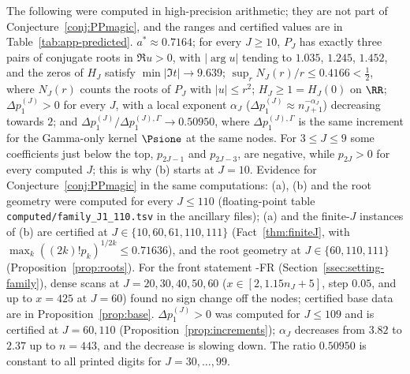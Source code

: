 \begin{observation}\label{obs:predicted}
The following were computed in high-precision arithmetic; they are not part of Conjecture~\ref{conj:PPmagic}, and the ranges
and certified values are in Table~\ref{tab:app-predicted}.
$a^*\approx0.7164$; for every $J\ge10$, $P_J$ has exactly three pairs of conjugate roots in $\Re u>0$, with $\lvert\arg u\rvert$
tending to $1.035$, $1.245$, $1.452$, and the zeros of $H_J$ satisfy $\min|\Im t|\to9.639$; $\sup_rN_J(r)/r\le0.4166<\frac12$,
where $N_J(r)$ counts the roots of $P_J$ with $|u|\le r^2$; $H_J\ge1=H_J(0)$ on $\RR$; $\Delta p_1^{(J)}>0$ for every $J$,
with a local exponent $\alpha_J$ ($\Delta p_1^{(J)}\approx n_{J+1}^{-\alpha_J}$) decreasing towards $2$; and
$\Delta p_1^{(J)}/\Delta p_1^{(J),\Gamma}\to0.50950$, where $\Delta p_1^{(J),\Gamma}$ is the same increment for the
Gamma-only kernel $\Psione$ at the same nodes. For $3\le J\le9$ some coefficients just below the top, $p_{2J-1}$ and
$p_{2J-3}$, are negative, while $p_{2J}>0$ for every computed $J$; this is why (b) starts at $J=10$.
Evidence for Conjecture~\ref{conj:PPmagic} in the same computations: (a), (b) and the root geometry were computed for every $J\le110$ (floating-point table
\nolinkurl{computed/family_J1_110.tsv} in the ancillary files); (a) and the finite-$J$ instances of (b) are certified at
$J\in\{10,60,61,110,111\}$ (Fact~\ref{thm:finiteJ}, with $\max_k((2k)!p_k)^{1/2k}\le0.71636$), and the root
geometry at $J\in\{60,110,111\}$ (Proposition~\ref{prop:roots}).
For the front statement \hyp{FR} (Section~\ref{ssec:setting-family}), dense scans at $J=20,30,40,50,60$ ($x\in[2,1.15n_J+5]$, step $0.05$, and up to $x=425$ at $J=60$) found no
sign change off the nodes; certified base data are in Proposition~\ref{prop:base}. $\Delta p_1^{(J)}>0$ was computed for
$J\le109$ and is certified at $J=60,110$ (Proposition~\ref{prop:increments}); $\alpha_J$ decreases from $3.82$ to $2.37$ up to
$n=443$, and the decrease is slowing down. The ratio $0.50950$ is constant to all printed digits for $J=30,\dots,99$.
\end{observation}

